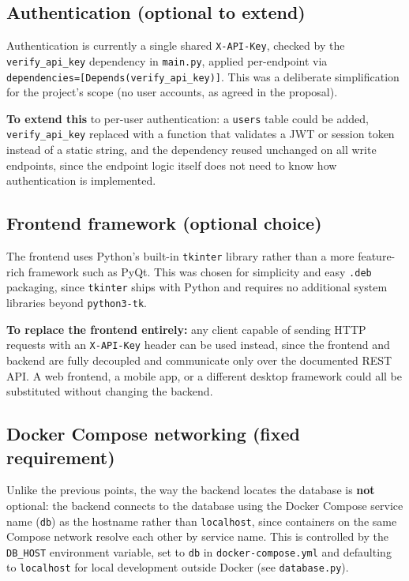 \documentclass[11pt,a4paper]{article}
\begin{document}
\subsection{Authentication (optional to extend)}

Authentication is currently a single shared \texttt{X-API-Key}, checked by the \texttt{verify\_api\_key} dependency in \texttt{main.py}, applied per-endpoint via \texttt{dependencies=[Depends(verify\_api\_key)]}. This was a deliberate simplification for the project's scope (no user accounts, as agreed in the proposal).

\textbf{To extend this} to per-user authentication: a \texttt{users} table could be added, \texttt{verify\_api\_key} replaced with a function that validates a JWT or session token instead of a static string, and the dependency reused unchanged on all write endpoints, since the endpoint logic itself does not need to know how authentication is implemented.

\subsection{Frontend framework (optional choice)}

The frontend uses Python's built-in \texttt{tkinter} library rather than a more feature-rich framework such as PyQt. This was chosen for simplicity and easy \texttt{.deb} packaging, since \texttt{tkinter} ships with Python and requires no additional system libraries beyond \texttt{python3-tk}.

\textbf{To replace the frontend entirely:} any client capable of sending HTTP requests with an \texttt{X-API-Key} header can be used instead, since the frontend and backend are fully decoupled and communicate only over the documented REST API. A web frontend, a mobile app, or a different desktop framework could all be substituted without changing the backend.

\subsection{Docker Compose networking (fixed requirement)}

Unlike the previous points, the way the backend locates the database is \textbf{not} optional: the backend connects to the database using the Docker Compose service name (\texttt{db}) as the hostname rather than \texttt{localhost}, since containers on the same Compose network resolve each other by service name. This is controlled by the \texttt{DB\_HOST} environment variable, set to \texttt{db} in \texttt{docker-compose.yml} and defaulting to \texttt{localhost} for local development outside Docker (see \texttt{database.py}).
\end{document}
